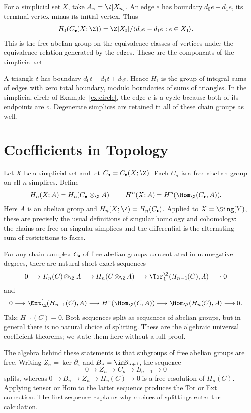 \documentclass[11pt]{article}
\begin{document}
\begin{example}
For a simplicial set $X$, take $A_n=\Z[X_n]$. An edge $e$ has boundary $d_0e-d_1e$, its terminal vertex minus its initial vertex. Thus
\[
H_0(C_\bullet(X;\Z))
=\Z[X_0]/\langle d_0e-d_1e:e\in X_1\rangle.
\]
This is the free abelian group on the equivalence classes of vertices under the equivalence relation generated by the edges. These are the components of the simplicial set.

A triangle $t$ has boundary $d_0t-d_1t+d_2t$. Hence $H_1$ is the group of integral sums of edges with zero total boundary, modulo boundaries of sums of triangles. In the simplicial circle of Example~\ref{ex:circle}, the edge $e$ is a cycle because both of its endpoints are $v$. Degenerate simplices are retained in all of these chain groups as well.
\end{example}

\section{Coefficients in Topology}\label{sec:topology}
Let $X$ be a simplicial set and let $C_\bullet=C_\bullet(X;\Z)$. Each $C_n$ is a free abelian group on all $n$-simplices. Define
\[
H_n(X;A)=H_n(C_\bullet\otimes_{\Z}A),\qquad
H^n(X;A)=H^n(\Hom_{\Z}(C_\bullet,A)).
\]
Here $A$ is an abelian group and $H_n(X;\Z)=H_n(C_\bullet)$. Applied to $X=\Sing(Y)$, these are precisely the usual definitions of singular homology and cohomology: the chains are free on singular simplices and the differential is the alternating sum of restrictions to faces.

\begin{remark}\label{rem:uct}
For any chain complex $C_\bullet$ of free abelian groups concentrated in nonnegative degrees, there are natural short exact sequences
\[
0\longrightarrow H_n(C)\otimes_{\Z}A
\longrightarrow H_n(C\otimes_{\Z}A)
\longrightarrow\Tor_1^{\Z}(H_{n-1}(C),A)\longrightarrow0
\]
and
\[
0\longrightarrow\Ext_{\Z}^1(H_{n-1}(C),A)
\longrightarrow H^n(\Hom_{\Z}(C,A))
\longrightarrow\Hom_{\Z}(H_n(C),A)\longrightarrow0.
\]
Take $H_{-1}(C)=0$. Both sequences split as sequences of abelian groups, but in general there is no natural choice of splitting. These are the algebraic universal coefficient theorems; we state them here without a full proof.
\end{remark}
The algebra behind these statements is that subgroups of free abelian groups are free. Writing $Z_n=\ker\partial_n$ and $B_n=\im\partial_{n+1}$, the sequence
\[
0\longrightarrow Z_n\longrightarrow C_n\longrightarrow B_{n-1}\longrightarrow0
\]
splits, whereas $0\to B_n\to Z_n\to H_n(C)\to0$ is a free resolution of $H_n(C)$. Applying tensor or Hom to the latter sequence produces the Tor or Ext correction. The first sequence explains why choices of splittings enter the calculation.
\end{document}
